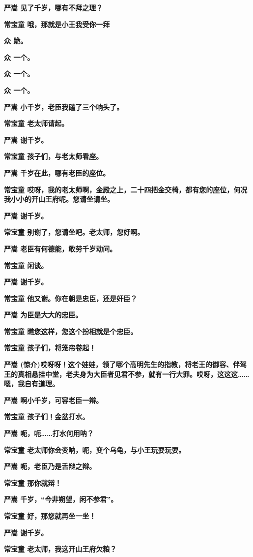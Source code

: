 \textbf{严嵩 见了千岁，哪有不拜之理？}

\textbf{常宝童 哦，那就是小王我受你一拜}

\textbf{众 跪。}

\textbf{众 一个。}

\textbf{众 一个。}

\textbf{众 一个。}

\textbf{严嵩 小千岁，老臣我磕了三个响头了。}

\textbf{常宝童 老太师请起。}

\textbf{严嵩 谢千岁。}

\textbf{常宝童 孩子们，与老太师看座。}

\textbf{严嵩 千岁在此，哪有老臣的座位。}

\textbf{常宝童
哎呀，我的老太师啊，金殿之上，二十四把金交椅，都有您的座位，何况我小小的开山王府呢。您请坐请坐。}

\textbf{严嵩 谢千岁。}

\textbf{常宝童 别谢了，您请坐吧。老太师，您好啊。}

\textbf{严嵩 老臣有何德能，敢劳千岁动问。}

\textbf{常宝童 闲谈。}

\textbf{严嵩 谢千岁。}

\textbf{常宝童 他又谢。你在朝是忠臣，还是奸臣？}

\textbf{严嵩 为臣是大大的忠臣。}

\textbf{常宝童 瞧您这样，您这个扮相就是个忠臣。}

\textbf{常宝童 孩子们，将笼帘卷起！}

\textbf{严嵩
(惊介)哎呀呀！这个娃娃，领了哪个高明先生的指教，将老王的御容、伴驾王的真相悬挂中堂，老夫身为大臣者见君不参，就有一行大罪。哎呀，这这这\ldots{}\ldots{}嗯，我自有道理。}

\textbf{严嵩 啊小千岁，可容老臣一辩。}

\textbf{常宝童 孩子们！金盆打水。}

\textbf{严嵩 呃，呃\ldots{}\ldots{}打水何用呐？}

\textbf{常宝童 老太师你会变呐，呃，变个乌龟，与小王玩耍玩耍。}

\textbf{严嵩 呃，老臣乃是舌辩之辩。}

\textbf{常宝童 那你就辩！}

\textbf{严嵩 千岁，``今非朔望，闲不参君''。}

\textbf{常宝童 好，那您就再坐一坐！}

\textbf{严嵩 谢千岁。}

\textbf{常宝童 老太师，我这开山王府欠粮？}

